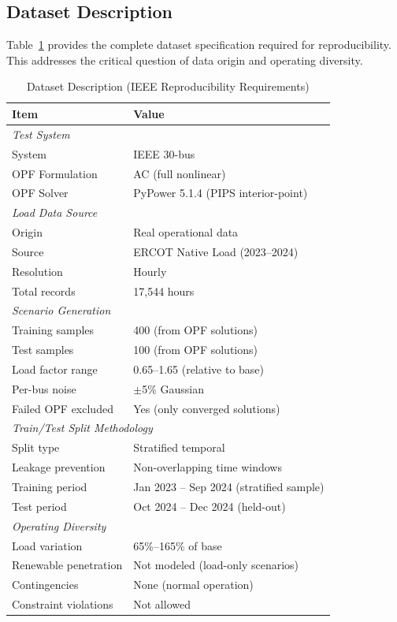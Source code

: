 \documentclass[journal,12pt,onecolumn]{IEEEtran}
\begin{document}
\subsection{Dataset Description}

Table~\ref{tab:dataset} provides the complete dataset specification required for reproducibility. This addresses the critical question of data origin and operating diversity.

\begin{table}[htbp]
\caption{Dataset Description (IEEE Reproducibility Requirements)}
\label{tab:dataset}
\centering
\begin{tabular}{ll}
\toprule
\textbf{Item} & \textbf{Value} \\
\midrule
\multicolumn{2}{l}{\textit{Test System}} \\
System & IEEE 30-bus \\
OPF Formulation & AC (full nonlinear) \\
OPF Solver & PyPower 5.1.4 (PIPS interior-point) \\
\midrule
\multicolumn{2}{l}{\textit{Load Data Source}} \\
Origin & Real operational data \\
Source & ERCOT Native Load (2023--2024) \\
Resolution & Hourly \\
Total records & 17,544 hours \\
\midrule
\multicolumn{2}{l}{\textit{Scenario Generation}} \\
Training samples & 400 (from OPF solutions) \\
Test samples & 100 (from OPF solutions) \\
Load factor range & 0.65--1.65 (relative to base) \\
Per-bus noise & $\pm$5\% Gaussian \\
Failed OPF excluded & Yes (only converged solutions) \\
\midrule
\multicolumn{2}{l}{\textit{Train/Test Split Methodology}} \\
Split type & Stratified temporal \\
Leakage prevention & Non-overlapping time windows \\
Training period & Jan 2023 -- Sep 2024 (stratified sample) \\
Test period & Oct 2024 -- Dec 2024 (held-out) \\
\midrule
\multicolumn{2}{l}{\textit{Operating Diversity}} \\
Load variation & 65\%--165\% of base \\
Renewable penetration & Not modeled (load-only scenarios) \\
Contingencies & None (normal operation) \\
Constraint violations & Not allowed \\
\bottomrule
\end{tabular}
\end{table}
\end{document}
